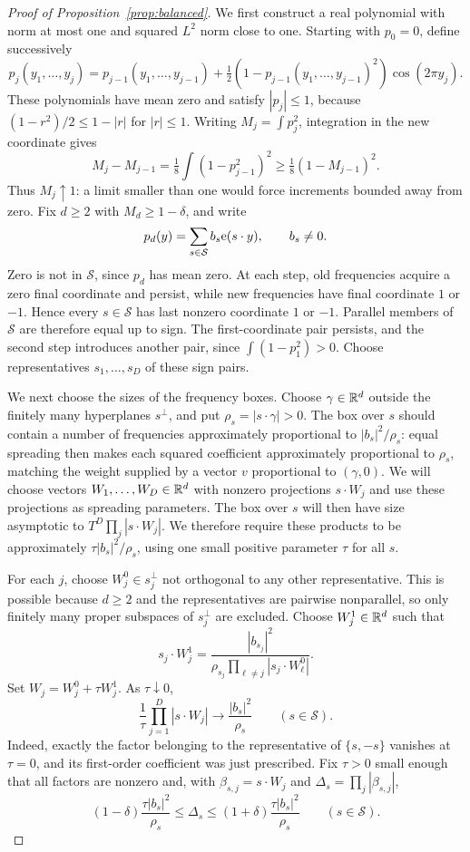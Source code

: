 \begin{proof}[Proof of Proposition~\ref{prop:balanced}]
We first construct a real polynomial with norm at most one and squared
$L^2$ norm close to one.  Starting with $p_0=0$, define successively
\[
 p_j(y_1,\ldots,y_j)
 =p_{j-1}(y_1,\ldots,y_{j-1})
  +\tfrac12(1-p_{j-1}(y_1,\ldots,y_{j-1})^2)\cos(2\pi y_j).
\]
These polynomials have mean zero and satisfy $|p_j|\le1$, because
$(1-r^2)/2\le1-|r|$ for $|r|\le1$.
Writing $M_j=\int p_j^2$, integration in the new coordinate gives
\[
 M_j-M_{j-1}=\tfrac18\int(1-p_{j-1}^2)^2
 \ge\tfrac18(1-M_{j-1})^2.
\]
Thus $M_j\uparrow1$: a limit smaller than one would force increments
bounded away from zero.  Fix $d\ge2$ with $M_d\ge1-\delta$, and write
\[
 p_d(y)=\sum_{s\in\mathcal S}b_s\mathrm e(s\cdot y),
 \qquad b_s\ne0.
\]
Zero is not in $\mathcal S$, since $p_d$ has mean zero.  At each step,
old frequencies acquire a zero final coordinate and persist, while
new frequencies have final coordinate $1$ or $-1$.  Hence every
$s\in\mathcal S$ has last nonzero coordinate $1$ or $-1$.
Parallel members of $\mathcal S$ are therefore equal up to sign.
The first-coordinate pair persists, and the second step introduces
another pair, since $\int(1-p_1^2)>0$.
Choose representatives $s_1,\ldots,s_D$ of these sign pairs.

We next choose the sizes of the frequency boxes.  Choose
$\gamma\in\mathbb R^d$ outside the finitely many hyperplanes $s^\perp$, and
put $\rho_s=|s\cdot\gamma|>0$.  The box over $s$ should contain a
number of frequencies approximately proportional to $|b_s|^2/\rho_s$:
equal spreading then makes each squared coefficient approximately
proportional to $\rho_s$, matching the weight supplied by a vector $v$
proportional to $(\gamma,0)$.  We will choose vectors
$W_1,\ldots,W_D\in\mathbb R^d$ with nonzero projections $s\cdot W_j$ and use
these projections as spreading parameters.  The box over $s$ will then
have size asymptotic to $T^D\prod_j|s\cdot W_j|$.  We therefore require
these products to be approximately $\tau|b_s|^2/\rho_s$, using one
small positive parameter $\tau$ for all $s$.

For each $j$, choose $W_j^0\in s_j^\perp$ not orthogonal to any other
representative.  This is possible because $d\ge2$ and the representatives
are pairwise nonparallel, so only finitely many proper subspaces of
$s_j^\perp$ are excluded.  Choose $W_j^1\in\mathbb R^d$ such that
\[
 s_j\cdot W_j^1
 =\frac{|b_{s_j}|^2}
 {\rho_{s_j}\prod_{\ell\ne j}|s_j\cdot W_\ell^0|}.
\]
Set $W_j=W_j^0+\tau W_j^1$.  As $\tau\downarrow0$,
\[
 \frac1\tau\prod_{j=1}^D|s\cdot W_j|
 \longrightarrow\frac{|b_s|^2}{\rho_s}
 \qquad(s\in\mathcal S).
\]
Indeed, exactly the factor belonging to the representative of $\{s,-s\}$
vanishes at $\tau=0$, and its first-order coefficient was just prescribed.
Fix $\tau>0$ small enough that all factors are nonzero and, with
$\beta_{s,j}=s\cdot W_j$ and $\Delta_s=\prod_j|\beta_{s,j}|$,
\begin{equation}\label{eq:projection-products}
 (1-\delta)\frac{\tau|b_s|^2}{\rho_s}
 \le\Delta_s\le
 (1+\delta)\frac{\tau|b_s|^2}{\rho_s}
 \qquad(s\in\mathcal S).
\end{equation}


\end{proof}
